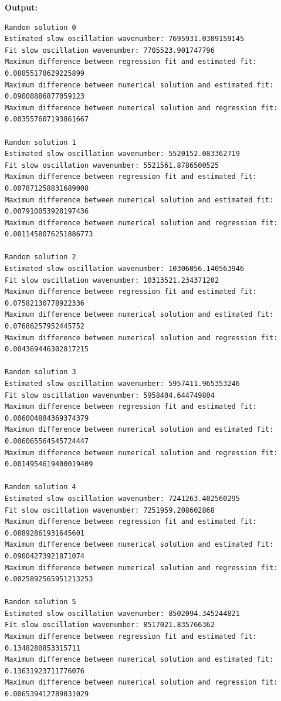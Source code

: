 \documentclass{article}
\begin{document}
\textbf{Output:}\begin{verbatim}
Random solution 0
Estimated slow oscillation wavenumber: 7695931.0389159145
Fit slow oscillation wavenumber: 7705523.901747796
Maximum difference between regression fit and estimated fit: 0.08855178629225899
Maximum difference between numerical solution and estimated fit: 0.09008886877059123
Maximum difference between numerical solution and regression fit: 0.003557607193861667

Random solution 1
Estimated slow oscillation wavenumber: 5520152.083362719
Fit slow oscillation wavenumber: 5521561.8786500525
Maximum difference between regression fit and estimated fit: 0.007871258831689008
Maximum difference between numerical solution and estimated fit: 0.007910053928197436
Maximum difference between numerical solution and regression fit: 0.0011458076251886773

Random solution 2
Estimated slow oscillation wavenumber: 10306056.140563946
Fit slow oscillation wavenumber: 10313521.234371202
Maximum difference between regression fit and estimated fit: 0.07582130778922336
Maximum difference between numerical solution and estimated fit: 0.07686257952445752
Maximum difference between numerical solution and regression fit: 0.004369446302817215

Random solution 3
Estimated slow oscillation wavenumber: 5957411.965353246
Fit slow oscillation wavenumber: 5958404.644749804
Maximum difference between regression fit and estimated fit: 0.006004884369374379
Maximum difference between numerical solution and estimated fit: 0.006065564545724447
Maximum difference between numerical solution and regression fit: 0.0014954619400019409

Random solution 4
Estimated slow oscillation wavenumber: 7241263.402560295
Fit slow oscillation wavenumber: 7251959.208602868
Maximum difference between regression fit and estimated fit: 0.08892861931645601
Maximum difference between numerical solution and estimated fit: 0.09004273921871074
Maximum difference between numerical solution and regression fit: 0.0025892565951213253

Random solution 5
Estimated slow oscillation wavenumber: 8502094.345244821
Fit slow oscillation wavenumber: 8517021.835766362
Maximum difference between regression fit and estimated fit: 0.1348280853315711
Maximum difference between numerical solution and estimated fit: 0.13631923711776076
Maximum difference between numerical solution and regression fit: 0.006539412789031029


\end{verbatim}
\end{document}
